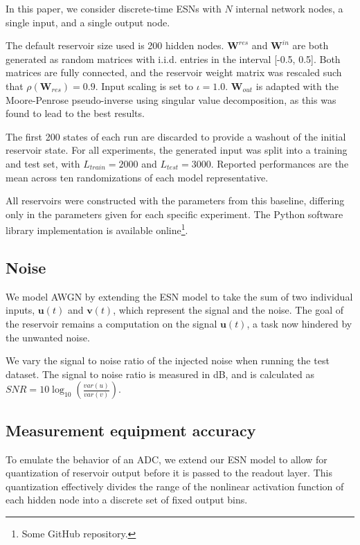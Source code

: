 In this paper, we consider discrete-time ESNs with $N$ internal network nodes, a
single input, and a single output node.

The default reservoir size used is 200 hidden nodes. $\mathbf{W}^{res}$ and
$\mathbf{W}^{in}$ are both generated as random matrices with i.i.d. entries in
the interval [-0.5, 0.5]. Both matrices are fully connected, and the reservoir
weight matrix was rescaled such that $\rho(\mathbf{W}_{res}) = 0.9$.  Input
scaling is set to $\iota = 1.0$. $\mathbf{W}_{out}$ is adapted with the
Moore-Penrose pseudo-inverse using singular value decomposition, as this was
found to lead to the best results.

The first 200 states of each run are discarded to provide a washout of the
initial reservoir state. For all experiments, the generated input was split into
a training and test set, with $L_{train} = 2000$ and $L_{test} = 3000$. Reported
performances are the mean across ten randomizations of each model
representative.

All reservoirs were constructed with the parameters from this baseline,
differing only in the parameters given for each specific experiment. The Python
software library implementation is available online\footnote{Some GitHub
repository.}.


\subsection{Noise}

We model AWGN by extending the ESN model to take the sum of two individual
inputs, $\mathbf{u}(t)$ and $\mathbf{v}(t)$, which represent the signal and the
noise. The goal of the reservoir remains a computation on the signal
$\mathbf{u}(t)$, a task now hindered by the unwanted noise.

We vary the signal to noise ratio of the injected noise when running the test
dataset. The signal to noise ratio is measured in dB, and is calculated as $SNR
= 10\log_{10}(\frac{var(u)}{var(v)})$.

\subsection{Measurement equipment accuracy}

To emulate the behavior of an ADC, we extend our ESN model to allow for
quantization of reservoir output before it is passed to the readout layer. This
quantization effectively divides the range of the nonlinear activation function
of each hidden node into a discrete set of fixed output bins.

